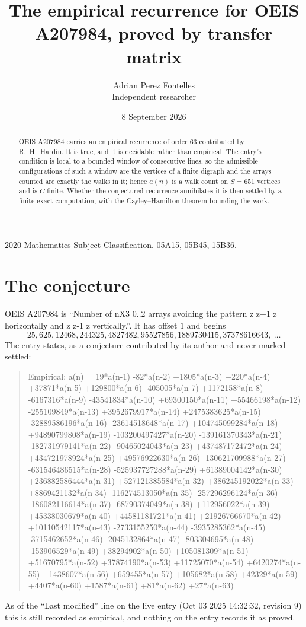 \documentclass[11pt,a4paper]{article}
\title{The empirical recurrence for OEIS A207984, proved by transfer matrix}
\author{Adrian Perez Fontelles\\ \small Independent researcher}
\date{8 September 2026}
\theoremstyle{plain}
\theoremstyle{definition}
\begin{document}
\maketitle

\begin{abstract}
OEIS A207984 carries an empirical recurrence of order $63$ contributed by R.~H.~Hardin. It is
true, and it is decidable rather than empirical. The entry's condition is local to a bounded window of consecutive lines, so
the admissible configurations of such a window are the vertices of a finite digraph and the
arrays counted are exactly the walks in it; hence $a(n)$ is a walk count on $S=651$ vertices
and is $C$-finite. Whether the conjectured recurrence annihilates it is then settled by a
finite exact computation, with the Cayley--Hamilton theorem bounding the work.
\end{abstract}

\noindent\small 2020 Mathematics Subject Classification. 05A15, 05B45, 15B36.\normalsize

\section{The conjecture}

OEIS A207984 is ``Number of nX3 0..2 arrays avoiding the pattern z z+1 z horizontally and z z-1 z vertically.''. It has offset $1$ and begins
\[
25, 625, 12468, 244325, 4827482, 95527856, 1889730415, 37378616643,\ \dots
\]
The entry states, as a conjecture contributed by its author and never marked settled:
\begin{quote}
Empirical: a(n) = 19*a(n-1) -82*a(n-2) +1805*a(n-3) +220*a(n-4) +37871*a(n-5) +129800*a(n-6) -405005*a(n-7) +1172158*a(n-8) -6167316*a(n-9) -43541834*a(n-10) +69300150*a(n-11) +55466198*a(n-12) -255109849*a(n-13) +3952679917*a(n-14) +2475383625*a(n-15) -32889586196*a(n-16) -23614518648*a(n-17) +104745099284*a(n-18) +94890799808*a(n-19) -103200497427*a(n-20) -139161370343*a(n-21) -182731979141*a(n-22) -90465024043*a(n-23) +437487172472*a(n-24) +434721978924*a(n-25) +49576922630*a(n-26) -130621709988*a(n-27) -631546486515*a(n-28) -525937727288*a(n-29) +61389004142*a(n-30) +236882586444*a(n-31) +527121385584*a(n-32) +386245192022*a(n-33) +8869421132*a(n-34) -116274513050*a(n-35) -257296296124*a(n-36) -186082116614*a(n-37) -68790374049*a(n-38) +112956022*a(n-39) +45338030679*a(n-40) +44581181721*a(n-41) +21926766670*a(n-42) +10110542117*a(n-43) -2733155250*a(n-44) -3935285362*a(n-45) -3715462652*a(n-46) -2045132864*a(n-47) -803304695*a(n-48) -153906529*a(n-49) +38294902*a(n-50) +105081309*a(n-51) +51670795*a(n-52) +37874190*a(n-53) +11725070*a(n-54) +6420274*a(n-55) +1438607*a(n-56) +659455*a(n-57) +105682*a(n-58) +42329*a(n-59) +4407*a(n-60) +1587*a(n-61) +81*a(n-62) +27*a(n-63)
\end{quote}
As of the ``Last modified'' line on the live entry (Oct 03 2025 14:32:32, revision 9) this is still
recorded as empirical, and nothing on the entry records it as proved.
\end{document}
